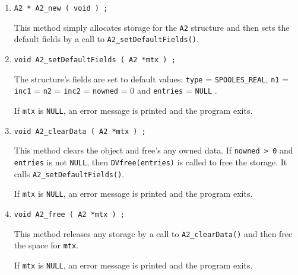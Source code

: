 \begin{enumerate}
\item
\begin{verbatim}
A2 * A2_new ( void ) ;
\end{verbatim}
This method simply allocates storage for the {\tt A2} structure 
and then sets the default fields by a call to 
{\tt A2\_setDefaultFields()}.
\item
\begin{verbatim}
void A2_setDefaultFields ( A2 *mtx ) ;
\end{verbatim}
The structure's fields are set to default values:
{\tt type} = {\tt SPOOLES\_REAL},
{\tt n1} = {\tt inc1} = {\tt n2} = {\tt inc2} = {\tt nowned} = 0 and 
{\tt entries} = {\tt NULL} .
\par {}
If {\tt mtx} is {\tt NULL},
an error message is printed and the program exits.
\item
\begin{verbatim}
void A2_clearData ( A2 *mtx ) ;
\end{verbatim}
This method clears the object and free's any owned data.
If {\tt nowned > 0} and {\tt entries} is not {\tt NULL}, 
then {\tt DVfree(entries)} is called to free the storage.
It calls {\tt A2\_setDefaultFields()}.
\par {}
If {\tt mtx} is {\tt NULL},
an error message is printed and the program exits.
\item
\begin{verbatim}
void A2_free ( A2 *mtx ) ;
\end{verbatim}
This method releases any storage by a call to 
{\tt A2\_clearData()} and then free the space for {\tt mtx}.
\par {}
If {\tt mtx} is {\tt NULL},
an error message is printed and the program exits.
\end{enumerate}
\par
